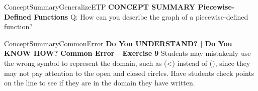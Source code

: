 \documentclass{article}
\newenvironment{te-addendum}[2]{}{}     %
\newcommand{\answer}[1]{}               %
\newcommand{\te}[1]{}                   %
\begin{document}
\begin{te-addendum}{ConceptSummary}{GeneralizeETP}
\textbf{CONCEPT SUMMARY Piecewise-Defined Functions}
Q: How can you describe the graph of a piecewise-defined function?
\answer{The graph of a piecewise-defined function has different pieces for different parts in the domain that may not be continuous.}
\te{Concept Summary, Do You Understand, and Do You Know How are available at SavvasRealize.com.}
\end{te-addendum}
\begin{te-addendum}{ConceptSummary}{CommonError}
\textbf{Do You UNDERSTAND? | Do You KNOW HOW?}
\textbf{Common Error—Exercise 9} Students may mistakenly use the wrong symbol to represent the domain, such as (<) instead of (\leq), since they may not pay attention to the open and closed circles. Have students check points on the line to see if they are in the domain they have written.
\end{te-addendum}
\end{document}

